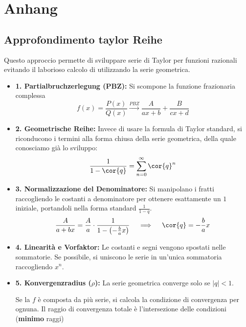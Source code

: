 \section{Anhang}
\subsection{Approfondimento taylor Reihe}

Questo approccio permette di sviluppare serie di Taylor per funzioni razionali evitando
il laborioso calcolo di  utilizzando la serie 
geometrica.

\begin{itemize}
    \item \textbf{1. Partialbruchzerlegung (PBZ):} Si scompone la funzione frazionaria complessa
    \begin{equation*}
        f(x) = \frac{P(x)}{Q(x)} \xrightarrow{PBZ} \frac{A}{ax+b} + \frac{B}{cx+d}
    \end{equation*}

    \item \textbf{2. Geometrische Reihe:} Invece di usare la formula di Taylor standard,
    si riconducono i termini alla forma chiusa della serie geometrica, della quale 
    conosciamo già lo sviluppo:
    \begin{equation*}
        \frac{1}{1-\cor{q}} = \sum_{n=0}^{\infty} \cor{q}^n
    \end{equation*}

    \item \textbf{3. Normalizzazione del Denominatore:} Si manipolano i fratti raccogliendo le costanti a denominatore per ottenere esattamente un $1$ iniziale, portandoli nella forma standard $\frac{1}{1-q}$.
    \begin{equation*}
        \frac{A}{a+bx} = \frac{A}{a} \cdot \frac{1}{1 - \left(-\frac{b}{a}x\right)} \quad \implies \quad \cor{q} = -\frac{b}{a}x
    \end{equation*}

    \item \textbf{4. Linearità e Vorfaktor:} Le costanti e segni vengono spostati nelle 
    sommatorie. Se possibile, si uniscono le serie in un'unica sommatoria raccogliendo $x^n$.

    \item \textbf{5. Konvergenzradius ($\rho$):} La serie geometrica converge solo se 
    $|q| < 1$. 
    
    Se la $f$ è composta da più serie, si calcola la condizione di convergenza 
    per ognuna. Il raggio di convergenza totale è l'intersezione delle condizioni 
    (\textbf{minimo} raggi)
\end{itemize}

